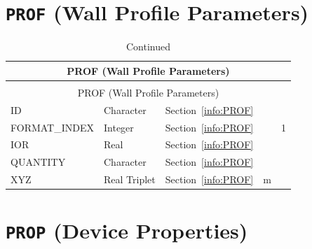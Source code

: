 \documentclass[11pt]{book}
\begin{document}
\vspace{\baselineskip}



\section{\texorpdfstring{{\tt PROF}}{PROF} (Wall Profile Parameters)}

\begin{longtable}{@{\extracolsep{\fill}}|l|l|l|l|l|}
\caption[Wall profile parameters ({\ct PROF} namelist group)]{For more information see Section~\ref{info:PROF}.}
\label{tbl:PROF} \\
\hline
\multicolumn{5}{|c|}{{\ct PROF} (Wall Profile Parameters)} \\
\hline \hline
\endfirsthead
\caption[]{Continued} \\
\hline
\multicolumn{5}{|c|}{{\ct PROF} (Wall Profile Parameters)} \\
\hline \hline
\endhead
{\ct ID}                    & Character         & Section~\ref{info:PROF}      &            &       \\ \hline
{\ct FORMAT\_INDEX}         & Integer           & Section~\ref{info:PROF}      &            & 1     \\ \hline
{\ct IOR}                   & Real              & Section~\ref{info:PROF}      &            &       \\ \hline
{\ct QUANTITY}              & Character         & Section~\ref{info:PROF}      &            &       \\ \hline
{\ct XYZ}                   & Real Triplet      & Section~\ref{info:PROF}      & m          &       \\ \hline
\end{longtable}

\vspace{\baselineskip}


\section{\texorpdfstring{{\tt PROP}}{PROP} (Device Properties)}
\end{document}
